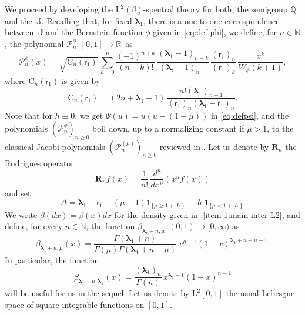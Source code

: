 \documentclass[JEP,XML,SOM,Unicode]{cedram}
\theoremstyle{plain}
\theoremstyle{definition}
\newcommand{\N}{\mathbb{N}}
\newcommand{\R}{\mathbb{R}}
\renewcommand{\P}{\mathcal{P}}
\newcommand{\Rc}{\mathbf{R}}
\newcommand{\C}{{\mathrm{C}}}
\newcommand{\J}{\mathds{Q}}
\newcommand{\calJ}{\mathds{J}}
\newcommand{\Leb}{\mathrm{L}}
\newcommand{\lam}{{\bm{\lambda}_1}}
\newcommand{\vat}{{\mathsf{r}_1}}
\newcommand{\gab}[1][\lam,\mo]{{\beta_{#1}}}
\let\h\hslash
\let\mo\mu
\let\bpsi\beta
\begin{document}
We proceed by developing the $\Leb^2(\bpsi)$-spectral theory for both, the semigroup $\J$ and the~$\calJ$. Recalling that, for fixed $\lam$, there is a one-to-one correspondence between~$\calJ$ and the Bernstein function $\phi$ given in \eqref{eq:def-phi}, we define, for $n \in \N$, the polynomial \hbox{$\P_n^\phi \colon [0,1] \to \R$}~as
\begin{equation}
\label{eq:Jpolpsi}
\P_n^\phi (x)= \sqrt{\C_n(\vat)}\, \sum_{k=0}^n \frac{(-1)^{n+k}}{(n-k)!}\, \frac{(\lam-1)_{n+k}}{(\lam-1)_{n\phantom{+k}}}\, \frac{(\vat)_n}{(\vat)_k}\, \frac{x^k}{W_\phi(k+1)},
\end{equation}
where $\C_n(\vat)$ is given by\vspace*{-3pt}
\begin{equation*}
\C_n(\vat)=(2n+\lam-1)\,\frac{n!(\lam)_{n-1}}{(\vat)_n(\lam-\vat)_n}.
\end{equation*}
Note that for $h \equiv 0$, we get $\Psi(u) = u(u-(1-\mo))$ in \eqref{eq:defpsi}, and the polynomials $(\P_n^\phi)_{n \geq 0}$ boil down, up to a normalizing constant if $\mu>1$, to the classical Jacobi polynomials $(\P_n^{(\mo)})_{n \geq 0}$ reviewed in . Let us denote by $\Rc_n$ the Rodrigues operator\vspace*{-3pt}
\begin{equation}
\label{eq:def-Rodrigues}
\Rc_n f(x) = \frac{1}{n!}\, \frac{d^n}{dx^n}(x^n f(x))
\end{equation}
and set\vspace*{-3pt}
\begin{equation} \label{Delta}
\Delta = \lam-\vat - (\mo-1)\bm{1}_{\{\mo \geq 1+\h\}} - \h\bm{1}_{\{\mo < 1+\h\}}.
\end{equation}
We write $\bpsi(dx) = \bpsi(x)dx$ for the density given in .\eqref{item-1:main-inter-L2}, and define,
for every $n \in \N$, the function $\gab[\lam+n,\mu] \colon (0,1) \to [0,\infty)$ as
\begin{equation*}
\gab[\lam+n,\mu](x) = \frac{\Gamma(\lam+n)}{\Gamma(\mu)\Gamma(\lam+n-\mu)}\, x^{\mu-1}(1-x)^{\lam+n-\mu-1}.
\end{equation*}
In particular, the function\vspace*{-3pt}
\begin{equation*}
\gab[\lam+n,\lam](x) = \frac{(\lam)_n}{\Gamma(n)}\, x^{\lam-1}(1-x)^{n-1}
\end{equation*}
will be useful for us in the sequel. Let us denote by
$\Leb^2[0,1]$ the usual Lebesgue space of square-integrable functions on $[0,1]$.
\end{document}
